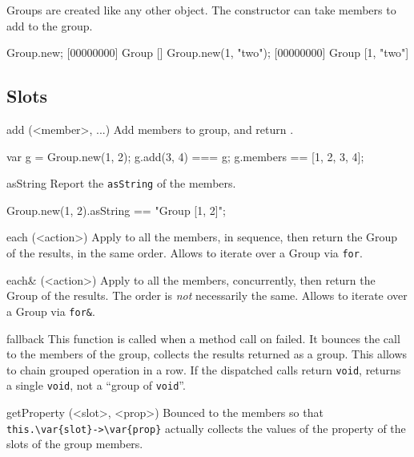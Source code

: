 Groups are created like any other object. The constructor can
take members to add to the group.

\begin{urbiscript}
Group.new;
[00000000] Group []
Group.new(1, "two");
[00000000] Group [1, "two"]
\end{urbiscript}

\subsection{Slots}

\begin{urbiscriptapi}
\item[add](<member>, ...)%
  Add members to \this group, and return \this.
\begin{urbiassert}
var g = Group.new(1, 2);
g.add(3, 4) === g;
g.members == [1, 2, 3, 4];
\end{urbiassert}

\item[asString]
  Report the \lstinline|asString| of the members.
\begin{urbiassert}
Group.new(1, 2).asString == "Group [1, 2]";
\end{urbiassert}

\item[each](<action>)%
  Apply  to all the members, in sequence, then return the
  Group of the results, in the same order.  Allows to iterate over a
  Group via \lstinline|for|.

\item[each&](<action>)%
  Apply  to all the members, concurrently, then return the
  Group of the results.  The order is \emph{not} necessarily the same.
  Allows to iterate over a Group via \lstinline|for&|.

\item[fallback]
  This function is called when a method call on \this
  failed.  It bounces the call to the members of the group, collects
  the results returned as a group.  This allows to chain grouped
  operation in a row.  If the dispatched calls return
  \lstinline|void|, returns a single \lstinline|void|, not a ``group
  of \lstinline|void|''.

\item[getProperty](<slot>, <prop>)%
  Bounced to the members so that
  \lstinline|this.\var{slot}->\var{prop}| actually collects the values
  of the property  of the slots  of the group
  members.


\end{urbiscriptapi}
